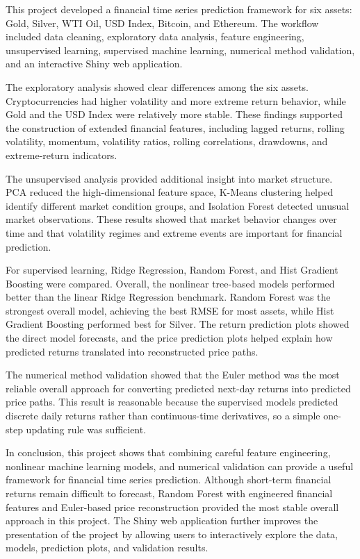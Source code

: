 \documentclass[12pt]{article}
\begin{document}
This project developed a financial time series prediction framework for six assets: Gold, Silver, WTI Oil, USD Index, Bitcoin, and Ethereum. The workflow included data cleaning, exploratory data analysis, feature engineering, unsupervised learning, supervised machine learning, numerical method validation, and an interactive Shiny web application.

The exploratory analysis showed clear differences among the six assets. Cryptocurrencies had higher volatility and more extreme return behavior, while Gold and the USD Index were relatively more stable. These findings supported the construction of extended financial features, including lagged returns, rolling volatility, momentum, volatility ratios, rolling correlations, drawdowns, and extreme-return indicators.

The unsupervised analysis provided additional insight into market structure. PCA reduced the high-dimensional feature space, K-Means clustering helped identify different market condition groups, and Isolation Forest detected unusual market observations. These results showed that market behavior changes over time and that volatility regimes and extreme events are important for financial prediction.

For supervised learning, Ridge Regression, Random Forest, and Hist Gradient Boosting were compared. Overall, the nonlinear tree-based models performed better than the linear Ridge Regression benchmark. Random Forest was the strongest overall model, achieving the best RMSE for most assets, while Hist Gradient Boosting performed best for Silver. The return prediction plots showed the direct model forecasts, and the price prediction plots helped explain how predicted returns translated into reconstructed price paths.

The numerical method validation showed that the Euler method was the most reliable overall approach for converting predicted next-day returns into predicted price paths. This result is reasonable because the supervised models predicted discrete daily returns rather than continuous-time derivatives, so a simple one-step updating rule was sufficient.

In conclusion, this project shows that combining careful feature engineering, nonlinear machine learning models, and numerical validation can provide a useful framework for financial time series prediction. Although short-term financial returns remain difficult to forecast, Random Forest with engineered financial features and Euler-based price reconstruction provided the most stable overall approach in this project. The Shiny web application further improves the presentation of the project by allowing users to interactively explore the data, models, prediction plots, and validation results.
\end{document}
